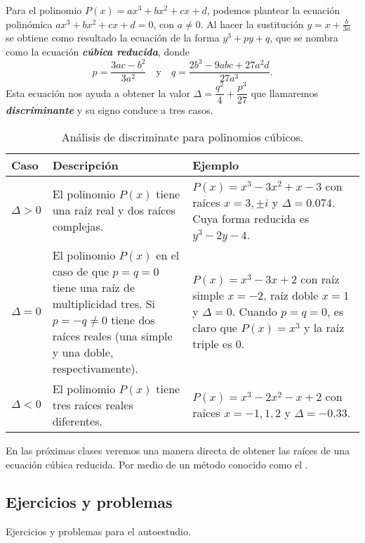 Para el polinomio $P(x) = ax^3 + bx^2 + cx + d$, podemos plantear la ecuación polinómica $ax^3 + bx^2 + cx + d = 0$, con $a \neq 0$.
Al hacer la sustitución $y = x + \frac{b}{3a}$ se obtiene como resultado la ecuación de la forma $y^3 + py + q$, que se nombra como la ecuación \textbf{\emph{cúbica reducida}}, donde
\[
    p = \frac{3ac - b^2}{3a^2}\quad\text{y}\quad q = \frac{2b^3 - 9abc + 27a^2 d}{27a^3}.
\]
Esta ecuación nos ayuda a obtener la valor $\Delta = \dfrac{q^2}{4} + \dfrac{p^3}{27}$ que llamaremos \textbf{\emph{discriminante}} y su signo conduce a tres casos.
\begin{table}[H]
    \centering
    \begin{tabular}{| p{1.4cm} | p{6.5cm} | p{6.5cm} |}
        \hline
        Caso & Descripción & Ejemplo \\ \hline
        $\Delta > 0$ & El polinomio $P(x)$ tiene una raíz real y dos raíces complejas.&
            $P(x) = x^3 - 3x^2 + x - 3$ con raíces $x = 3, \pm i$ y $\Delta = 0.074$.
            Cuya forma reducida es $y^3 - 2y - 4$. \\\hline
        $\Delta = 0$ & El polinomio $P(x)$ en el caso de que $p = q = 0$ tiene una raíz de multiplicidad tres.
        Si $p = -q \neq 0$ tiene dos raíces reales (una simple y una doble, respectivamente).&
            $P(x) = x^3 - 3x + 2$ con raíz simple $x = -2$, raíz doble $x = 1$ y $\Delta = 0$.
            Cuando $p = q = 0$, es claro que $P(x) = x^3$ y la raíz triple es 0.\\\hline
        $\Delta < 0$ & El polinomio $P(x)$ tiene tres raíces reales diferentes.&
            $P(x) = x^3 - 2x^2 - x + 2$ con raíces $x = -1, 1, 2$ y $\Delta = -0.33$. \\\hline
    \end{tabular}
    \caption{Análisis de discriminate para polinomios cúbicos.}
\end{table}

En las próximas clases veremos una manera directa de obtener las raíces de una ecuación cúbica reducida.
Por medio de un método conocido como el .



\subsection{Ejercicios y problemas}

Ejercicios y problemas para el autoestudio.

\showLine


